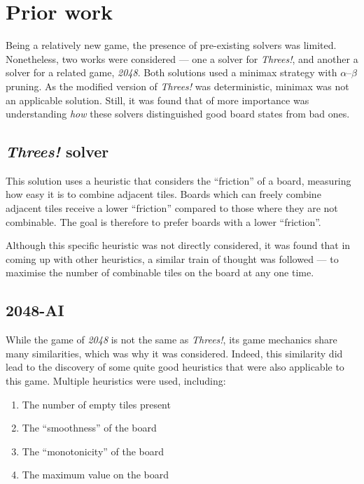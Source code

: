 \documentclass[a4paper, 11pt, titlepage]{report}
\newcommand{\threes}{\emph{Threes!}}
\begin{document}
\section{Prior work}
Being a relatively new game, the presence of pre-existing solvers was limited. Nonetheless, two works were considered --- one a solver for \threes{}\cite{tsolver}, and another a solver for a related game, \emph{2048}\cite{2048solver}. Both solutions used a minimax strategy with $\alpha$--$\beta$ pruning. As the modified version of \threes{} was deterministic, minimax was not an applicable solution. Still, it was found that of more importance was understanding \emph{how} these solvers distinguished good board states from bad ones.

\subsection{\threes{} solver} \label{threes-solver}
This solution uses a heuristic that considers the ``friction'' of a board, measuring how easy it is to combine adjacent tiles\cite{tsolver}. Boards which can freely combine adjacent tiles receive a lower ``friction'' compared to those where they are not combinable. The goal is therefore to prefer boards with a lower ``friction''.

Although this specific heuristic was not directly considered, it was found that in coming up with other heuristics, a similar train of thought was followed --- to maximise the number of combinable tiles on the board at any one time.

\subsection{2048-AI}\label{2048-solver}
While the game of \emph{2048} is not the same as \threes{}, its game mechanics share many similarities, which was why it was considered. Indeed, this similarity did lead to the discovery of some quite good heuristics that were also applicable to this game. Multiple heuristics were used, including:
\begin{enumerate}
	\singlespacing
	\item{The number of empty tiles present}
	\item{The ``smoothness'' of the board}
	\item{The ``monotonicity'' of the board}
	\item{The maximum value on the board}
	\onehalfspacing
\end{enumerate}
\end{document}
